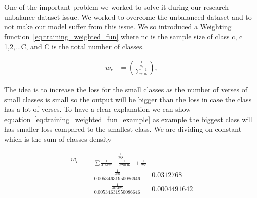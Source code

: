 One of the important problem we worked to solve it during our research unbalance dataset issue. We worked to overcome the unbalanced dataset and to not make our model suffer from this issue. We so introduced a Weighting function~\ref{eq:training_weighted_fun} where nc is the sample size of class c, c = 1,2,...C, and C
is the total number of classes.

\begin{align}
  w_c &= \left(\frac{\frac{1}{n_c}}{\sum_c \frac{1}{n_c}} \right),\label{eq:training_weighted_fun}
\end{align}

The idea is to increase the loss for the small classes as the number of verses of small classes is small so the output will be bigger than the loss in case the class has a lot of verses. To have a clear explanation we can show equation~\ref{eq:training_weighted_fun_example} as example the biggest class will has smaller loss compared to the smallest class. We are dividing on constant which is the sum of classes density

\begin{subequations}
\begin{align}
  w_c &=  \frac{\frac{1}{288}}{\sum\frac{1}{416428}+\frac{1}{370116}\dots+\frac{1}{288}}\\
      &= \frac{\frac{1}{288}}{0.00534631950086646} = ~0.0312768 \\
        &= \frac{\frac{1}{416428}}{0.00534631950086646} = ~0.0004491642
\end{align}\label{eq:training_weighted_fun_example}
\end{subequations}

